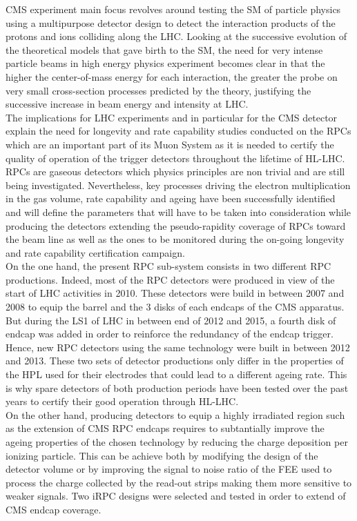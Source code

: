 CMS experiment main focus revolves around testing the \acf{SM} of particle physics using a multipurpose detector design to detect the interaction products of the protons and ions colliding along the LHC. Looking at the successive evolution of the theoretical models that gave birth to the SM, the need for very intense particle beams in high energy physics experiment becomes clear in that the higher the center-of-mass energy for each interaction, the greater the probe on very small cross-section processes predicted by the theory, justifying the successive increase in beam energy and intensity at LHC.\\
The implications for LHC experiments and in particular for the CMS detector explain the need for longevity and rate capability studies conducted on the \acl{RPC}s which are an important part of its Muon System as it is needed to certify the quality of operation of the trigger detectors throughout the lifetime of HL-LHC.\\
RPCs are gaseous detectors which physics principles are non trivial and are still being investigated. Nevertheless, key processes driving the electron multiplication in the gas volume, rate capability and ageing have been successfully identified and will define the parameters that will have to be taken into consideration while producing the detectors extending the pseudo-rapidity coverage of RPCs toward the beam line as well as the ones to be monitored during the on-going longevity and rate capability certification campaign.\\
On the one hand, the present RPC sub-system consists in two different RPC productions. Indeed, most of the RPC detectors were produced in view of the start of LHC activities in 2010. These detectors were build in between 2007 and 2008 to equip the barrel and the 3 disks of each endcaps of the CMS apparatus. But during the \acf{LS1} of LHC in between end of 2012 and 2015, a fourth disk of endcap was added in order to reinforce the redundancy of the endcap trigger. Hence, new RPC detectors using the same technology were built in between 2012 and 2013. These two sets of detector productions only differ in the properties of the \acf{HPL} used for their electrodes that could lead to a different ageing rate. This is why spare detectors of both production periods have been tested over the past years to certify their good operation through HL-LHC.\\
On the other hand, producing detectors to equip a highly irradiated region such as the extension of CMS RPC endcaps requires to subtantially improve the ageing properties of the chosen technology by reducing the charge deposition per ionizing particle. This can be achieve both by modifying the design of the detector volume or by improving the signal to noise ratio of the \acf{FEE} used to process the charge collected by the read-out strips making them more sensitive to weaker signals. Two \acf{iRPC} designs were selected and tested in order to extend of CMS endcap coverage.\\
